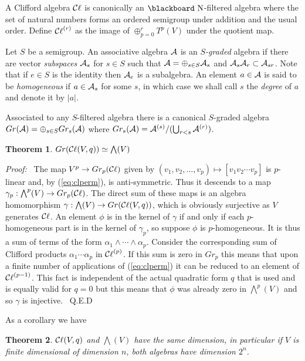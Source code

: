 \documentclass[12pt,titlepage]{article}
\def\bbf#1{\hbox{\blackboard #1}}
\def\lN{\bbf N}
\def\cA{{\cal A}}
\def\cC{{\cal C}}
\def\Cl{{\cC\ell}}
\newtheorem{theorem}{Theorem}
\newenvironment{proof}{{\em Proof:\/}\ }{\ Q.E.D}
\begin{document}
A Clifford algebra \(\Cl\) is canonically an \(\lN\)-filtered algebra
where the set of natural numbers forms an ordered semigroup under 
addition and 
the usual order.
 Define \(\Cl^{(r)}\) as the
image of \(\oplus_{p=0}^r T^p(V)\) under the quotient map.




Let \(S\) be a semigroup. An associative algebra \(\cA\) is an
{\em \(S\)-graded\/}
%
 algebra if there are  vector {\em subspaces\/}  \(\cA_s\)
for \(s\in S\) such that
\(\cA=\oplus_{s\in S}\cA_s\) and
\(\cA_s\cA_r\subset\cA_{sr}\). Note that if \(e\in S\) is the identity 
then \(\cA_e\) is a subalgebra.
An element \(a\in\cA\) is said to be {\em homogeneous\/}
%
 if
\(a\in\cA_s\) for some \(s\), in which case we shall call \(s\)
the {\em degree\/}
%
 of \(a\) and denote it by \(|a|\).



Associated to any \(S\)-filtered algebra there is a canonical
\(S\)-graded algebra  \(Gr(\cA)=\oplus_{s\in S}Gr_s(\cA)\)
where \(Gr_s(\cA) = \cA^{(s)}/(\bigcup_{r<s}\cA^{(r)})\).

\begin{theorem}\(Gr(\Cl(V,q))\simeq\bigwedge(V)\)
\end{theorem}%
\begin{proof} The  map \(V^p\to Gr_p(\Cl)\) given by
\((v_1,v_2,\dots,v_p)\mapsto [v_1v_2\cdots v_p]\) is
\(p\)-linear  and, by (\ref{eq:clperm}), is anti-symmetric. 
Thus it descends
to a map \(\gamma_p:\bigwedge^p(V)\to Gr_p(\Cl)\).
The direct sum of these  maps is an
algebra homomorphism \(\gamma:\bigwedge(V) \to Gr(\Cl(V,q))\),
which is obviously surjective as \(V\) generates \(\Cl\). 
An element \(\phi\) is in the kernel of
\(\gamma\) if and only if each \(p\)-homogeneous part is in the kernel
of \(\gamma_p\), so suppose \(\phi\) is \(p\)-homogeneous. It is thus a sum
of terms of the form \(\alpha_1\wedge\cdots\wedge\alpha_p\). Consider the
corresponding sum of Clifford products \(\alpha_1\cdots\alpha_p\) in
\(\Cl^{(p)}\). If this sum is zero
in \(Gr_p\) this means that upon a finite number of applications
of (\ref{eq:clperm}) it can be reduced to an element of \(\Cl^{(p-1)}\).
This fact is independent of the actual quadratic form \(q\) that is used
and is equally valid for \(q=0\) but this means that \(\phi\) was already
zero in \(\bigwedge^p(V)\) and so \(\gamma\) is injective.
\end{proof}%

As a corollary we have
\begin{theorem} \(\Cl(V,q)\) and \(\bigwedge(V)\) have the same
dimension, in particular if \(V\) is finite dimensional of dimension
\(n\), both algebras have dimension \(2^n\).
\end{theorem}
\end{document}
